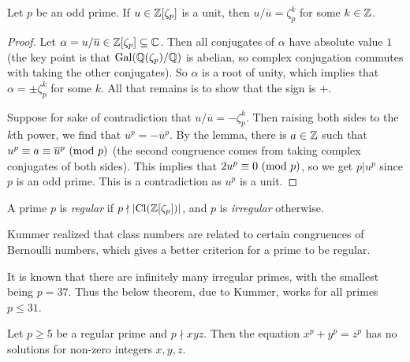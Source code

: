 \begin{theorem}[Kummer]
  Let $p$ be an odd prime. If $u \in \mathbb{Z}[\zeta_p]$ is
  a unit, then $u / \overline{u} = \zeta_p^k$ for some
  $k \in \mathbb{Z}$.
\end{theorem}

\begin{proof}
  Let $\alpha = u / \overline{u} \in \mathbb{Z}[\zeta_p] \subseteq \mathbb{C}$.
  Then all conjugates of $\alpha$ have absolute
  value $1$ (the key point is that
  $\operatorname{Gal}(\mathbb{Q}(\zeta_p) / \mathbb{Q})$ is abelian, so complex
  conjugation commutes with taking the other conjugates).
  So $\alpha$ is a root of unity, which implies
  that $\alpha = \pm \zeta_p^k$ for some $k$. All that
  remains is to show that the sign is $+$.

  Suppose for sake of contradiction that
  $u / \overline{u} = -\zeta_p^k$. Then raising
  both sides to the $k$th power, we find that
  $u^p = -\overline{u}^p$. By the lemma, 
  there is $a \in \mathbb{Z}$ such that $u^p \equiv a \equiv \overline{u}^p \ (\mathrm{mod}\ p)$ (the second congruence
  comes from taking complex conjugates of both sides).
  This implies that $2 u^p \equiv 0 \ (\mathrm{mod}\ p)$, so
  we get $p | u^p$ since $p$ is an odd prime. This
  is a contradiction as $u^p$ is a unit.
\end{proof}

\begin{definition}
  A prime $p$ is \emph{regular} if
  $p \nmid |{\operatorname{Cl}(\mathbb{Z}[\zeta_p])}|$, and $p$ is
  \emph{irregular} otherwise.
\end{definition}

\begin{remark}
  Kummer realized that class numbers are related
  to certain congruences of Bernoulli numbers, which
  gives a better criterion for a prime to be regular.
\end{remark}

\begin{remark}
  It is known that there are infinitely many irregular
  primes, with the smallest being $p = 37$. Thus the
  below theorem, due to Kummer, works for all
  primes $p \le 31$.
\end{remark}

\begin{theorem}
  Let $p \ge 5$ be a regular prime and $p \nmid xyz$.
  Then the equation
  $x^p + y^p = z^p$ has no solutions for
  non-zero integers $x, y, z$.
\end{theorem}

